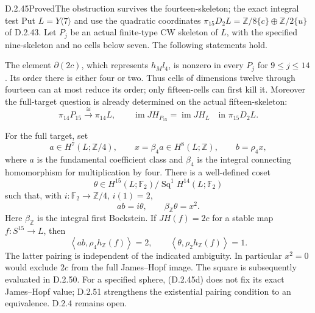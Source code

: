 \begin{claim}{D.2.45}{Proved}{The obstruction survives the fourteen-skeleton; the exact integral test}
Put $L=Y\langle7\rangle$ and use the quadratic coordinates
$\pi_{15}D_2L=\mathbb Z/8\{c\}\oplus\mathbb Z/2\{u\}$
of D.2.43.  Let $P_j$ be an actual finite-type CW skeleton of
$L$, with the specified nine-skeleton and no cells below seven.
The following statements hold.

The element $\partial(2c)$, which represents $h_Ml_4$,
is nonzero in every $P_j$ for $9\leq j\leq14$.
Its order there is either four or two.  Thus cells of dimensions
twelve through fourteen can at most reduce its order; only
fifteen-cells can first kill it.  Moreover the full-target
question is already determined on the actual fifteen-skeleton:
\[
 \pi_{14}P_{15}\xrightarrow{\ \cong\ }\pi_{14}L,
 \qquad
 \operatorname{im}JH_{P_{15}}=\operatorname{im}JH_L
             \quad\text{in }\pi_{15}D_2L.
 \tag{D.2.45a}
\]

For the full target, set
\[
 a\in H^7(L;\mathbb Z/4),\qquad
 x=\beta_4a\in H^8(L;\mathbb Z),\qquad b=\rho_4x,
 \tag{D.2.45b}
\]
where $a$ is the fundamental coefficient class and $\beta_4$
is the integral connecting homomorphism for multiplication
by four.  There is a well-defined coset
\[
 \theta\in H^{15}(L;\mathbb F_2)/
                      \operatorname{Sq}^1H^{14}(L;\mathbb F_2)
\]
such that, with $i:\mathbb F_2\to\mathbb Z/4$, $i(1)=2$,
\[
 a b=i\theta,\qquad \beta_{\mathbb Z}\theta=x^2.
 \tag{D.2.45c}
\]
Here $\beta_{\mathbb Z}$ is the integral first Bockstein.
If $JH(f)=2c$ for a stable map $f:S^{15}\to L$, then
\[
 \left\langle a b,\rho_4h_{\mathbb Z}(f)\right\rangle=2,
 \qquad
 \left\langle\theta,\rho_2h_{\mathbb Z}(f)\right\rangle=1.
 \tag{D.2.45d}
\]
The latter pairing is independent of the indicated ambiguity.
In particular $x^2=0$ would exclude $2c$ from the full
James--Hopf image. The square is subsequently evaluated in
D.2.50. For a specified sphere, (D.2.45d) does not fix its exact
James--Hopf value; D.2.51 strengthens the existential pairing
condition to an equivalence. D.2.4 remains open.
\end{claim}
